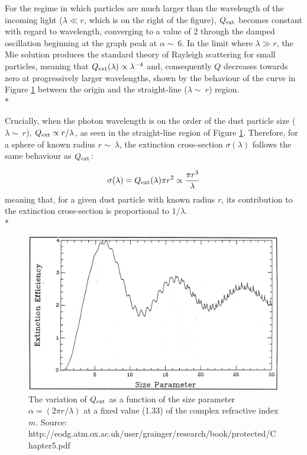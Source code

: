\documentclass[12pt, a4paper]{report}
\begin{document}
For the regime in which particles are much larger than the wavelength of the incoming light ($\lambda \ll r$, which is on the right of the figure), $Q_{\textnormal{ext}}$ becomes constant with regard to wavelength, converging to a value of 2 through the damped oscillation beginning at the graph peak at $\alpha \sim\ 6$. In the limit where $\lambda \gg r$, the Mie solution produces the standard theory of Rayleigh scattering for small particles, meaning that $Q_{\textnormal{ext}}(\lambda) \propto \lambda^{-4}$ and, consequently $Q$ decreases towards zero at progressively larger wavelengths, shown by the behaviour of the curve in Figure \ref{Qlambda_curve} between the origin and the straight-line ($\lambda \sim\ r$) region.\\*

Crucially, when the photon wavelength is on the order of the dust particle size ($\lambda \sim\ r$),  $Q_{\textnormal{ext}} \propto r/\lambda$, as seen in the straight-line region of Figure \ref{Qlambda_curve}. Therefore, for a sphere of known radius $r \sim\ \lambda$, the extinction cross-section $\sigma(\lambda)$ follows the
same behaviour as $Q_{\textnormal{ext}}$:
 
\begin{equation}
\sigma(\lambda) = Q_{\textnormal{ext}}(\lambda){\pi r^{2}} \propto \frac{\pi r^{3}}{\lambda}
\label{x_section_wavelength}
\end{equation}
meaning that, for a given dust particle with known radius $r$, its contribution to the extinction cross-section is proportional to $1/\lambda$. \\*


\begin{figure}[h!]
\begin{center}
\includegraphics[width=1.0\textwidth]{grainger_ch5_Qext_vs_wavelength.png}
\caption{The variation of $Q_{\textnormal{ext}}$ as a function of the size parameter $\alpha = (2\pi r/\lambda)$ at a fixed value (1.33) of the complex refractive index $m$. Source: http://eodg.atm.ox.ac.uk/user/grainger/research/book/protected/Chapter5.pdf}
\label{Qlambda_curve}
\end{center}
\end{figure}
\end{document}
